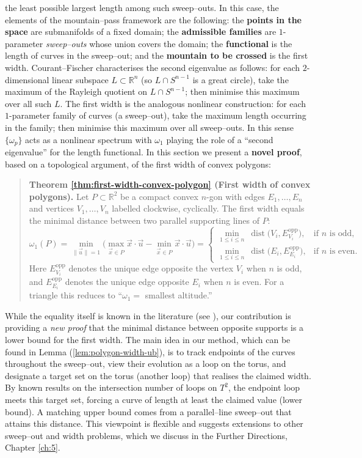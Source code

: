 the least possible largest length among such sweep--outs. In this case, the elements of the mountain--pass framework are the following: the \textbf{points in the space} are submanifolds of a fixed domain; the \textbf{admissible families} are $1$-parameter \emph{sweep--outs} whose union covers the domain; the \textbf{functional} is the length of curves in the sweep--out; and the \textbf{mountain to be crossed} is the first width. Courant--Fischer characterises the second eigenvalue as follows: for each $2$-dimensional linear subspace $L\subset\mathbb{R}^n$ (so $L\cap S^{n-1}$ is a great circle), take the maximum of the Rayleigh quotient on $L\cap S^{n-1}$; then minimise this maximum over all such $L$. The first width is the analogous nonlinear construction: for each $1$-parameter family of curves (a sweep–out), take the maximum length occurring in the family; then minimise this maximum over all sweep–outs. In this sense $\{\omega_p\}$ acts as a nonlinear spectrum with $\omega_1$ playing the role of a “second eigenvalue” for the length functional. In this section we present a \textbf{novel proof}, based on a topological argument, of the first width of convex polygons: 
\begin{quote}
\textbf{Theorem \ref{thm:first-width-convex-polygon} (First width of convex polygons).}
Let $P\subset\mathbb{R}^2$ be a compact convex $n$-gon with edges $E_1,\dots,E_n$ and vertices $V_1,\dots,V_n$ labelled clockwise, cyclically. The first width equals the minimal distance between two parallel supporting lines of $P$:
\[
\omega_1(P)
= \min_{\|\vec{u}\|=1} \big( \max_{\vec{x}\in P} \vec{x}\!\cdot \vec{u} - \min_{\vec{x}\in P} \vec{x}\!\cdot \vec{u} \big)
= \begin{cases}
        \displaystyle \min_{1\le i\le n}\ \operatorname{dist}\!\big(V_i,E_{V_i}^{\mathrm{opp}}\big), & \text{if $n$ is odd},\\
        \displaystyle \min_{1\le i\le n}\ \operatorname{dist}\!\big(E_i,E_{E_i}^{\mathrm{opp}}\big), & \text{if $n$ is even}.
    \end{cases}
\]
Here $E_{V_i}^{\mathrm{opp}}$ denotes the unique edge opposite the vertex $V_i$ when $n$ is odd, and $E_{E_i}^{\mathrm{opp}}$ denotes the unique 
edge opposite $E_i$ when $n$ is even. For a triangle this reduces to “$\omega_1 =$ smallest altitude.”
\end{quote}
While the equality itself is known in the literature (see \cite{Chodosh25}), our contribution is providing a \emph{new proof} that the minimal distance between opposite supports is a lower bound for the first width. The main idea in our method, which can be found in Lemma (\ref{lem:polygon-width-ub}), is to track endpoints of the curves throughout the sweep--out, view their evolution as a loop on the torus, and designate a target set on the torus (another loop) that realises the claimed width. By known results on the intersection number of loops on $T^2$, the endpoint loop meets this target set, forcing a curve of length at least the claimed value (lower bound). A matching upper bound comes from a parallel--line sweep--out that attains this distance. This viewpoint is flexible and suggests extensions to other sweep--out and width problems, which we discuss in the Further Directions, Chapter \ref{ch:5}.

